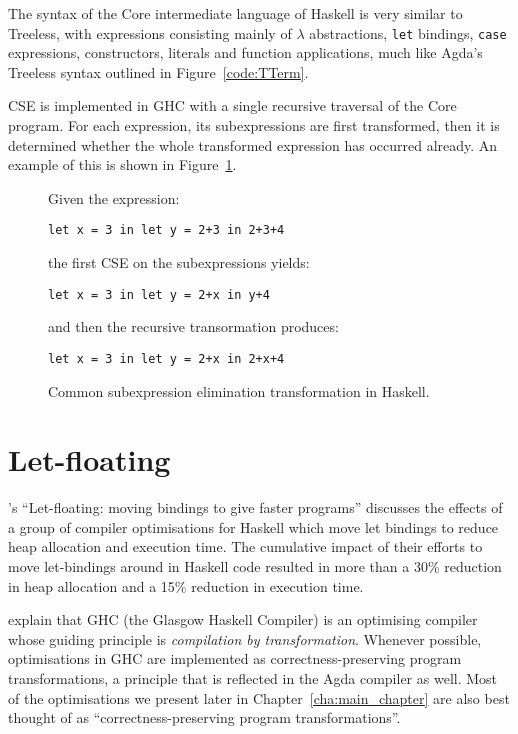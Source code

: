 The syntax of the Core intermediate language of Haskell is very similar to Treeless, with expressions consisting mainly of $\lambda$ abstractions, \lstinline{let} bindings, \lstinline{case} expressions, constructors, literals and function applications, much like Agda's Treeless syntax outlined in Figure~\ref{code:TTerm}.

CSE is implemented in GHC with a single recursive traversal of the Core program. For each expression, its subexpressions are first transformed, then it is determined whether the whole transformed expression has occurred already.\citep{Chitil-1998} An example of this is shown in Figure~\ref{code:cse_haskell}.

\begin{figure}[h]
Given the expression:

\lstinline{let x = 3 in let y = 2+3 in 2+3+4}

the first CSE on the subexpressions yields:

\lstinline{let x = 3 in let y = 2+x in y+4}

and then the recursive transormation produces:

\lstinline{let x = 3 in let y = 2+x in 2+x+4}

\caption{Common subexpression elimination transformation in Haskell.\citep{Chitil-1998}}
\label{code:cse_haskell}
\end{figure}

\section{Let-floating}
\label{sec:let_floating}

\citet{jones1996}'s ``Let-floating: moving bindings to give faster programs'' discusses the effects of a group of compiler optimisations for Haskell which move let bindings to reduce heap allocation and execution time. The cumulative impact of their efforts to move let-bindings around in Haskell code resulted in more than a 30\% reduction in heap allocation and a 15\% reduction in execution time.

\citet{jones1996} explain that GHC (the Glasgow Haskell Compiler) is an optimising compiler whose guiding principle is \textit{compilation by transformation}. Whenever possible, optimisations in GHC are implemented as correctness-preserving program transformations, a principle that is reflected in the Agda compiler as well. Most of the optimisations we present later in Chapter~\ref{cha:main_chapter} are also best thought of as ``correctness-preserving program transformations''.

